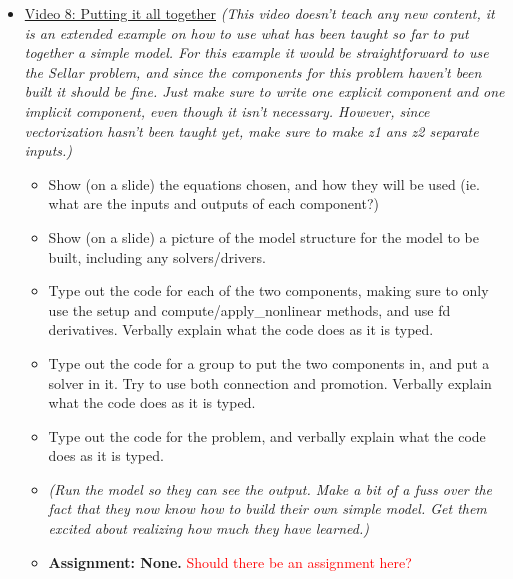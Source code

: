 \documentclass[12pt, letterpaper]{article}
\begin{document}
\begin{itemize}
	\item \underline{Video 8: Putting it all together} \textit{(This video doesn’t teach any new content, it is an extended example on how to use what has been taught so far to put together a simple model. For this example it would be straightforward to use the Sellar problem, and since the components for this problem haven't been built it should be fine. Just make sure to write one explicit component and one implicit component, even though it isn't necessary. However, since vectorization hasn't been taught yet, make sure to make z1 ans z2 separate inputs.)}
		\begin{itemize}
			\item Show (on a slide) the equations chosen, and how they will be used (ie. what are the inputs and outputs of each component?)
			\item Show (on a slide) a picture of the model structure for the model to be built, including any solvers/drivers.
			\item Type out the code for each of the two components, making sure to only use the setup and compute/apply\_nonlinear methods, and use fd derivatives. Verbally explain what the code does as it is typed.
			\item Type out the code for a group to put the two components in, and put a solver in it. Try to use both connection and promotion. Verbally explain what the code does as it is typed.
			\item Type out the code for the problem, and verbally explain what the code does as it is typed.
			\item \textit{(Run the model so they can see the output. Make a bit of a fuss over the fact that they now know how to build their own simple model. Get them excited about realizing how much they have learned.)}
			\item \textbf{Assignment: None.} \textcolor{red}{Should there be an assignment here?}
		\end{itemize}


\end{itemize}
\end{document}
